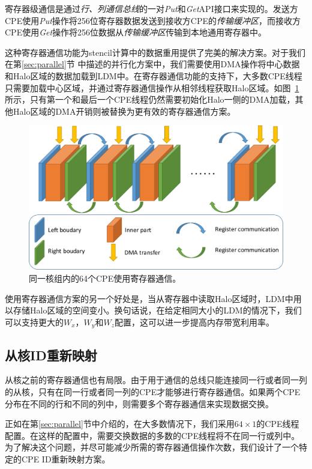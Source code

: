 \documentclass[degree=doctor]{thuthesis}
\begin{document}
寄存器级通信是通过\emph{行、列通信总线}的一对\emph{Put}和\emph{Get}API接口来实现的。发送方CPE使用\emph {Put}操作将256位寄存器数据发送到接收方CPE的\emph{传输缓冲区}，而接收方CPE使用\emph{Get}操作将256位数据从\emph{传输缓冲区}传输到本地通用寄存器中。

这种寄存器通信功能为stencil计算中的数据重用提供了完美的解决方案。对于我们在第\ref{sec:parallel}节
中描述的并行化方案中，我们需要使用DMA操作将中心数据和Halo区域的数据加载到LDM中。在寄存器通信功能的支持下，大多数CPE线程只需要加载中心区域，并通过寄存器通信操作从相邻线程获取Halo区域。如图~\ref{fig:64by1-reg}所示，只有第一个和最后一个CPE线程仍然需要初始化Halo一侧的DMA加载，其他Halo区域的DMA开销则被替换为更有效的寄存器通信方案。


\begin{figure}[h]
\centering
\includegraphics[width=0.7\columnwidth]{awp_using_register.png}
\caption{同一核组内的64个CPE使用寄存器通信。}
\label{fig:64by1-reg}
\end{figure}

使用寄存器通信方案的另一个好处是，当从寄存器中读取Halo区域时，LDM中用以存储Halo区域的空间变小。换句话说，在给定相同大小的LDM的情况下，我们可以支持更大的$ W_x $，$ W_y $和$ W_z $配置，这可以进一步提高内存带宽利用率。

\subsection{从核ID重新映射}

从核之前的寄存器通信也有局限。由于用于通信的总线只能连接同一行或者同一列的从核，只有在同一行或者同一列的CPE才能够进行寄存器通信。如果两个CPE分布在不同的行和不同的列中，则需要多个寄存器通信来实现数据交换。

正如在第\ref{sec:parallel}节中介绍的，在大多数情况下，我们采用$ 64 \times1 $的CPE线程配置。在这样的配置中，需要交换数据的多数的CPE线程将不在同一行或列中。为了解决这个问题，并尽可能减少所需的寄存器通信操作次数，我们设计了一个特定的CPE ID重新映射方案。
\end{document}
